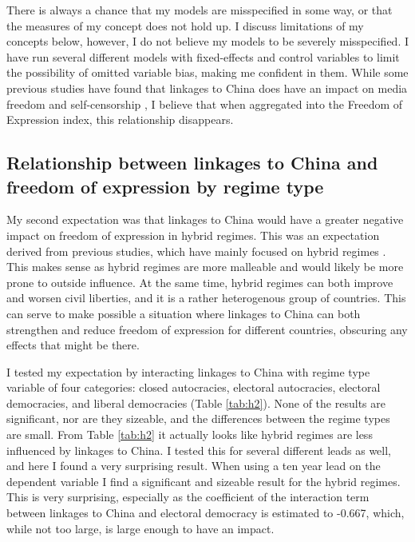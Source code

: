 There is always a chance that my models are misspecified in some way, or that the measures of my concept does not hold up. I discuss limitations of my concepts below, however, I do not believe my models to be severely misspecified. I have run several different models with fixed-effects and control variables to limit the possibility of omitted variable bias, making me confident in them. While some previous studies have found that linkages to China does have an impact on media freedom and self-censorship \citep{gamso_is_2021, toettoe_foreign_2023}, I believe that when aggregated into the Freedom of Expression index, this relationship disappears. 

\subsection{Relationship between linkages to China and freedom of expression by regime type}
My second expectation was that linkages to China would have a greater negative impact on freedom of expression in hybrid regimes. This was an expectation derived from previous studies, which have mainly focused on hybrid regimes \citep{tansey_ties_2017, toettoe_foreign_2023}. This makes sense as hybrid regimes are more malleable and would likely be more prone to outside influence. At the same time, hybrid regimes can both improve and worsen civil liberties, and it is a rather heterogenous group of countries. This can serve to make possible a situation where linkages to China can both strengthen and reduce freedom of expression for different countries, obscuring any effects that might be there.

I tested my expectation by interacting linkages to China with regime type variable of four categories: closed autocracies, electoral autocracies, electoral democracies, and liberal democracies (Table \ref{tab:h2}). None of the results are significant, nor are they sizeable, and the differences between the regime types are small. From Table \ref{tab:h2} it actually looks like hybrid regimes are less influenced by linkages to China. I tested this for several different leads as well, and here I found a very surprising result. When using a ten year lead on the dependent variable I find a significant and sizeable result for the hybrid regimes. This is very surprising, especially as the coefficient of the interaction term between linkages to China and electoral democracy is estimated to -0.667, which, while not too large, is large enough to have an impact.


